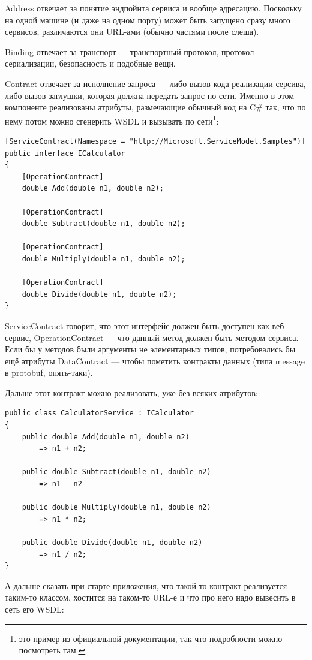 \documentclass[a5paper]{article}
\begin{document}
Address отвечает за понятие эндпойнта сервиса и вообще адресацию. Поскольку на одной машине (и даже на одном порту) может быть запущено сразу много сервисов, различаются они URL-ами (обычно частями после слеша).

Binding отвечает за транспорт --- транспортный протокол, протокол сериализации, безопасность и подобные вещи.

Contract отвечает за исполнение запроса --- либо вызов кода реализации серсива, либо вызов заглушки, которая должна передать запрос по сети. Именно в этом компоненте реализованы атрибуты, размечающие обычный код на C\# так, что по нему потом можно сгенерить WSDL и вызывать по сети\footnote{это пример из официальной документации, так что подробности можно посмотреть там.}: 

\begin{verbatim}
[ServiceContract(Namespace = "http://Microsoft.ServiceModel.Samples")]  
public interface ICalculator  
{
    [OperationContract]
    double Add(double n1, double n2);

    [OperationContract]
    double Subtract(double n1, double n2);

    [OperationContract]
    double Multiply(double n1, double n2);

    [OperationContract]
    double Divide(double n1, double n2);
}
\end{verbatim}

ServiceContract говорит, что этот интерфейс должен быть доступен как веб-сервис, OperationContract --- что данный метод должен быть методом сервиса. Если бы у методов были аргументы не элементарных типов, потребовались бы ещё атрибуты DataContract --- чтобы пометить контракты данных (типа message в protobuf, опять-таки).

Дальше этот контракт можно реализовать, уже без всяких атрибутов:

\begin{verbatim}
public class CalculatorService : ICalculator  
{
    public double Add(double n1, double n2)
        => n1 + n2;  

    public double Subtract(double n1, double n2)
        => n1 - n2

    public double Multiply(double n1, double n2)  
        => n1 * n2;

    public double Divide(double n1, double n2)  
        => n1 / n2;
}
\end{verbatim}

А дальше сказать при старте приложения, что такой-то контракт реализуется таким-то классом, хостится на таком-то URL-е и что про него надо вывесить в сеть его WSDL:
\end{document}
